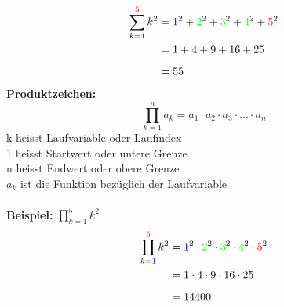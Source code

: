 \documentclass[10pt,landscape]{article}
\begin{document}
\begin{multicols}{3}
    \begin{align*} \sum_{k={\color{blue}1}}^{{\color{red}5}} k^2 &= {\color{blue}1}^2 + {\color{green}2}^2 + {\color{green}3}^2 + {\color{green}4}^2 + {\color{red}5}^2 \\ &= 1 + 4 + 9 + 16 + 25 \\[5px] &= 55 \end{align*}
    \textbf{Produktzeichen:}
    \[ \prod_{k=1}^{n} a_k = a_1 \cdot a_2 \cdot a_3 \cdot \ldots \cdot a_n\]
    k heisst Laufvariable oder Laufindex \\
    1 heisst Startwert oder untere Grenze \\
    n heisst Endwert oder obere Grenze \\
    $a_{k}$ ist die Funktion bezüglich der Laufvariable \\~\\
    \textbf{Beispiel:}
    $\prod_{k=1}^{5} k^2$ \\
    \begin{align*} \prod_{k={\color{blue}1}}^{{\color{red}5}} k^2 &= {\color{blue}1}^2 \cdot {\color{green}2}^2 \cdot {\color{green}3}^2 \cdot {\color{green}4}^2 \cdot {\color{red}5}^2 \\ &= 1 \cdot 4 \cdot 9 \cdot 16 \cdot 25 \\[5px] &= 14400 \end{align*}


\end{multicols}
\end{document}
